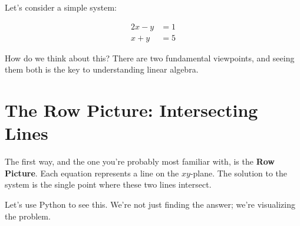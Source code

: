\documentclass[
  letterpaper,
  DIV=11,
  numbers=noendperiod]{scrreprt}
\begin{document}
Let's consider a simple system:

\[
\begin{align*}
2x - y &= 1 \\
x + y &= 5
\end{align*}
\]

How do we think about this? There are two fundamental viewpoints, and
seeing them both is the key to understanding linear algebra.

\section{The Row Picture: Intersecting
Lines}\label{the-row-picture-intersecting-lines}

The first way, and the one you're probably most familiar with, is the
\textbf{Row Picture}. Each equation represents a line on the
\(xy\)-plane. The solution to the system is the single point where these
two lines intersect.

Let's use Python to see this. We're not just finding the answer; we're
visualizing the problem.
\end{document}
